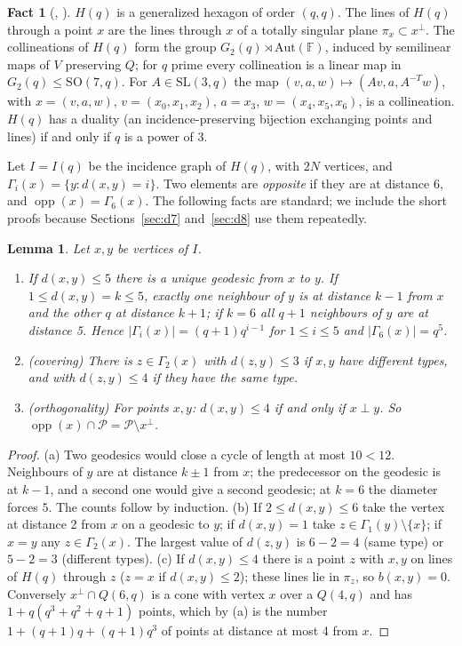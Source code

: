 \documentclass[11pt]{amsart}
\newtheorem{lemma}[theorem]{Lemma}
\theoremstyle{definition}
\newtheorem{fact}[theorem]{Fact}
\theoremstyle{remark}
\numberwithin{equation}{section}
\newcommand{\F}{\mathbb F}
\newcommand{\opp}{\operatorname{opp}}
\newcommand{\cP}{\mathcal P}
\newcommand{\SL}{\mathrm{SL}}
\begin{document}
\begin{fact}[\cite{T59}, {\cite[\S2.4]{VM98}}]\label{fact:hex}
$H(q)$ is a generalized hexagon of order $(q,q)$. The lines of $H(q)$ through a point $x$ are the lines through $x$ of a
totally singular plane $\pi_x\subset x^\perp$. The collineations of $H(q)$ form the group $G_2(q)\rtimes\mathrm{Aut}(\F)$, induced by semilinear maps of $V$ preserving $Q$;
for $q$ prime every collineation is a linear map in $G_2(q)\le\mathrm{SO}(7,q)$. For $A\in\SL(3,q)$ the map
$(v,a,w)\mapsto(Av,a,A^{-T}w)$, with $x=(v,a,w)$, $v=(x_0,x_1,x_2)$, $a=x_3$, $w=(x_4,x_5,x_6)$, is a collineation. $H(q)$
has a duality (an incidence-preserving bijection exchanging points and lines) if and only if $q$ is a power of $3$.
\end{fact}

Let $I=I(q)$ be the incidence graph of $H(q)$, with $2N$ vertices, and $\Gamma_i(x)=\{y:d(x,y)=i\}$. Two elements are
\emph{opposite} if they are at distance 6, and $\opp(x)=\Gamma_6(x)$. The following facts are standard; we include the
short proofs because Sections~\ref{sec:d7} and~\ref{sec:d8} use them repeatedly.

\begin{lemma}\label{lem:hexfacts}
Let $x,y$ be vertices of $I$.
\begin{enumerate}[label=(\alph*)]
\item If $d(x,y)\le5$ there is a unique geodesic from $x$ to $y$. If $1\le d(x,y)=k\le5$, exactly one neighbour of $y$ is
  at distance $k-1$ from $x$ and the other $q$ at distance $k+1$; if $k=6$ all $q+1$ neighbours of $y$ are at distance
  5. Hence $|\Gamma_i(x)|=(q+1)q^{i-1}$ for $1\le i\le5$ and $|\Gamma_6(x)|=q^5$.
\item \emph{(covering)} There is $z\in\Gamma_2(x)$ with $d(z,y)\le3$ if $x,y$ have different types, and with
  $d(z,y)\le4$ if they have the same type.
\item \emph{(orthogonality)} For points $x,y$: $d(x,y)\le4$ if and only if $x\perp y$. So $\opp(x)\cap\cP=\cP\setminus
  x^\perp$.
\end{enumerate}
\end{lemma}

\begin{proof}
(a) Two geodesics would close a cycle of length at most $10<12$. Neighbours of $y$ are at distance $k\pm1$ from $x$;
the predecessor on the geodesic is at $k-1$, and a second one would give a second geodesic; at $k=6$ the diameter
forces $5$. The counts follow by induction. (b) If $2\le d(x,y)\le6$ take the vertex at distance 2 from $x$ on a
geodesic to $y$; if $d(x,y)=1$ take $z\in\Gamma_1(y)\setminus\{x\}$; if $x=y$ any $z\in\Gamma_2(x)$. The largest value
of $d(z,y)$ is $6-2=4$ (same type) or $5-2=3$ (different types). (c) If $d(x,y)\le4$ there is a point $z$ with $x,y$
on lines of $H(q)$ through $z$ ($z=x$ if $d(x,y)\le2$); these lines lie in $\pi_z$, so $b(x,y)=0$. Conversely
$x^\perp\cap Q(6,q)$ is a cone with vertex $x$ over a $Q(4,q)$ and has $1+q(q^3+q^2+q+1)$ points, which by (a) is the
number $1+(q+1)q+(q+1)q^3$ of points at distance at most 4 from $x$.
\end{proof}
\end{document}
